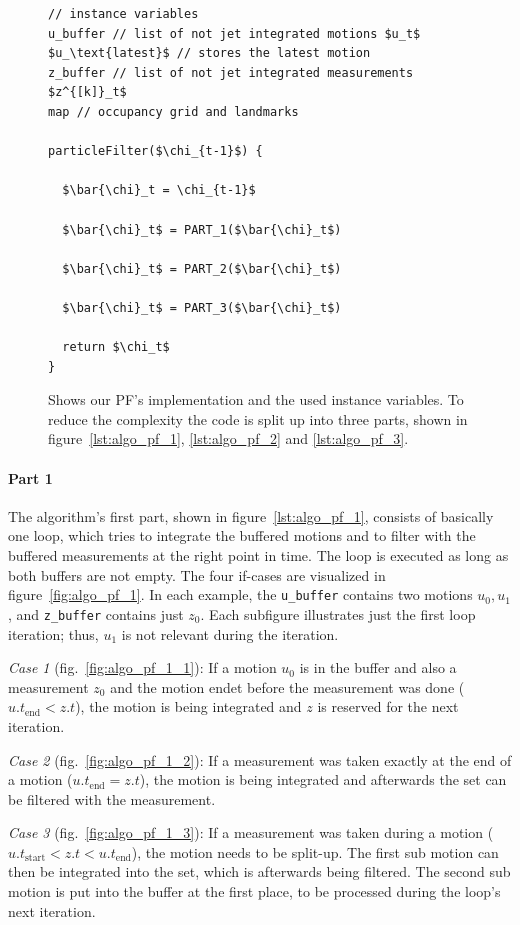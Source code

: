 \begin{figure}
\begin{lstlisting}[mathescape]
// instance variables
u_buffer // list of not jet integrated motions $u_t$
$u_\text{latest}$ // stores the latest motion
z_buffer // list of not jet integrated measurements $z^{[k]}_t$
map // occupancy grid and landmarks

particleFilter($\chi_{t-1}$) {

  $\bar{\chi}_t = \chi_{t-1}$

  $\bar{\chi}_t$ = PART_1($\bar{\chi}_t$)
  
  $\bar{\chi}_t$ = PART_2($\bar{\chi}_t$)
  
  $\bar{\chi}_t$ = PART_3($\bar{\chi}_t$)
    
  return $\chi_t$
}
\end{lstlisting}
\caption{Shows our \acs{PF}'s implementation and the used instance variables. To reduce the complexity the code is split up into three parts, shown in figure~\ref{lst:algo_pf_1}, \ref{lst:algo_pf_2} and \ref{lst:algo_pf_3}.}
\label{lst:algo_pf}
\end{figure}


\paragraph{Part 1} The algorithm's first part, shown in figure~\ref{lst:algo_pf_1}, consists of basically one loop, which tries to integrate the buffered motions and to filter with the buffered measurements at the right point in time. The loop is executed as long as both buffers are not empty. The four if-cases are visualized in figure~\ref{fig:algo_pf_1}. In each example, the \texttt{u\_buffer} contains two motions $u_0, u_1$, and \texttt{z\_buffer} contains just $z_0$. Each subfigure illustrates just the first loop iteration; thus, $u_1$ is not relevant during the iteration.

\emph{Case 1} (fig.\ \ref{fig:algo_pf_1_1}): If a motion $u_0$ is in the buffer and also a measurement $z_0$ and the motion endet before the measurement was done ($u.{t_\text{end}} < z.t$), the motion is being integrated and $z$ is reserved for the next iteration.

\emph{Case 2} (fig.\ \ref{fig:algo_pf_1_2}): If a measurement was taken exactly at the end of a motion ($u.{t_\text{end}} = z.t$), the motion is being integrated and afterwards the set can be filtered with the measurement.

\emph{Case 3} (fig.\ \ref{fig:algo_pf_1_3}): If a measurement was taken during a motion ($u.{t_\text{start}} < z.t < u.{t_\text{end}}$), the motion needs to be split-up. The first sub motion can then be integrated into the set, which is afterwards being filtered. The second sub motion is put into the buffer at the first place, to be processed during the loop's next iteration.

